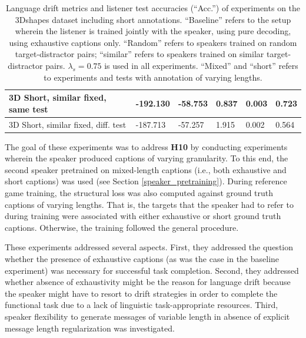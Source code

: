 \begin{table}[]
\begin{tabularx}{\textwidth}{|X|l|l|X|X|X|}
		3D Short, similar fixed, same test&      -192.130      &     -58.753      &   0.837      & 0.003   &     0.723                \\ \hline
		3D Short, similar fixed, diff. test &  -187.713       & -57.257     & 1.915        &  0.002   &    0.564       \\ \hline
	\end{tabularx}
	\caption{\label{tab:3dshapes_drift_metrics_basic_short} Language drift metrics and listener test accuracies (``Acc.'') of experiments on the 3Dshapes dataset including short annotations. 
		``Baseline'' refers to the setup wherein the listener is trained jointly with the speaker, using pure decoding, using exhaustive captions only. ``Random'' refers to speakers trained on random target-distractor pairs; ``similar'' refers to speakers trained on similar target-distractor pairs. $\lambda_s = 0.75$ is used in all experiments. ``Mixed'' and ``short'' refers to experiments and tests with annotation of varying lengths.}
\end{table}

The goal of these experiments was to address \textbf{H10} by conducting experiments wherein the speaker produced captions of varying granularity.
To this end, the second speaker pretrained on mixed-length captions (i.e., both exhaustive and short captions) was used (see Section \ref{speaker_pretraining}). During reference game training, the structural loss was also computed against ground truth captions of varying lengths. That is, the targets that the speaker had to refer to during training were associated with either exhaustive or short ground truth captions. Otherwise, the training followed the general procedure.

These experiments addressed several aspects. First, they addressed the question whether the presence of exhaustive captions (as was the case in the baseline experiment) was necessary for successful task completion. Second, they addressed whether absence of exhaustivity might be the reason for language drift because the speaker might have to resort to drift strategies in order to complete the functional task due to a lack of linguistic task-appropriate resources. 
Third, speaker flexibility to generate messages of variable length in absence of explicit message length regularization was investigated. 

